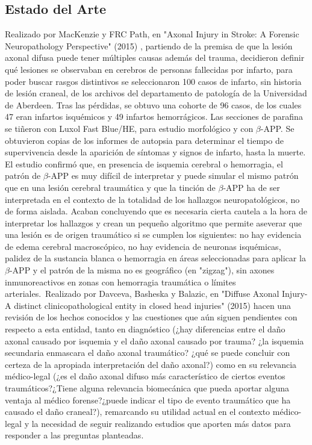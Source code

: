 \subsection{Estado del Arte}
Realizado por MacKenzie y FRC Path, en "Axonal Injury in Stroke: A Forensic Neuropathology Perspective" (2015) \cite{MacKenzie2015}, partiendo de la premisa de que la lesión axonal difusa puede tener múltiples causas además del trauma, decidieron definir qué lesiones se observaban en cerebros de personas fallecidas por infarto, para poder buscar rasgos distintivos se seleccionaron 100 casos de infarto, sin historia de lesión craneal, de los archivos del departamento de patología de la Universidad de Aberdeen. Tras las pérdidas, se obtuvo una cohorte de 96 casos, de los cuales 47 eran infartos isquémicos y 49 infartos hemorrágicos. Las secciones de parafina se tiñeron con Luxol Fast Blue/HE, para estudio morfológico y con $\beta$-APP. Se obtuvieron copias de los informes de autopsia para determinar el tiempo de supervivencia desde la aparición de síntomas y signos de infarto, hasta la muerte. El estudio confirmó que, en presencia de isquemia cerebral o hemorragia, el patrón de $\beta$-APP es muy difícil de interpretar y puede simular el mismo patrón que en una lesión cerebral traumática y que la tinción de $\beta$-APP ha de ser interpretada en el contexto de la totalidad de los hallazgos neuropatológicos, no de forma aislada. Acaban concluyendo que es necesaria cierta cautela a la hora de interpretar los hallazgos y crean un pequeño algoritmo que permite aseverar que una lesión es de origen traumático si se cumplen los siguientes: no hay evidencia de edema cerebral macroscópico, no hay evidencia de neuronas isquémicas, palidez de la sustancia blanca o hemorragia en áreas seleccionadas para aplicar la $\beta$-APP y el patrón de la misma no es geográfico (en "zigzag"), sin axones inmunoreactivos en zonas con hemorragia traumática o límites arteriales.\
Realizado por Davceva, Basheska y Balazic, en "Diffuse Axonal Injury- A distinct clinicopathological entity in closed head injuries" (2015) \cite{Davceva2015} hacen una revisión de los hechos conocidos y las cuestiones que aún siguen pendientes con respecto a esta entidad, tanto en diagnóstico (¿hay diferencias entre el daño axonal causado por isquemia y el daño axonal causado por trauma? ¿la isquemia secundaria enmascara el daño axonal traumático? ¿qué se puede concluir con certeza de la apropiada interpretación del daño axonal?) como en su relevancia médico-legal (¿es el daño axonal difuso más característico de ciertos eventos traumáticos?¿Tiene alguna relevancia biomecánica que pueda aportar alguna ventaja al médico forense?¿puede indicar el tipo de evento traumático que ha causado el daño craneal?), remarcando su utilidad actual en el contexto médico-legal y la necesidad de seguir realizando estudios que aporten más datos para responder a las preguntas planteadas. \

